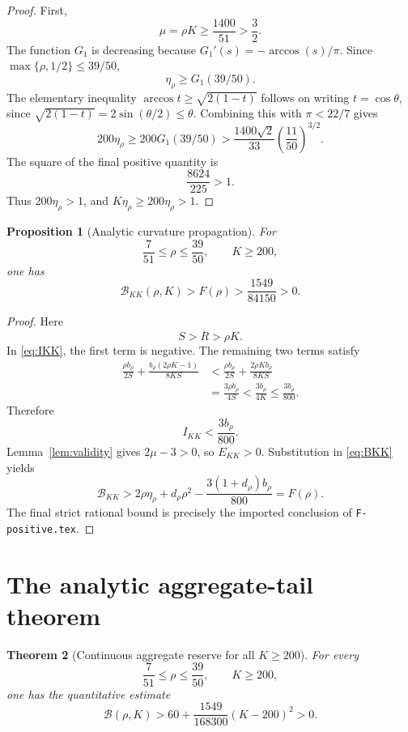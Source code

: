 \documentclass[11pt]{article}
\newtheorem{theorem}{Theorem}
\newtheorem{proposition}[theorem]{Proposition}
\newcommand{\Bcal}{\mathcal B}
\newcommand{\Rbar}{\overline R}
\begin{document}
\begin{proof}
First,
\[
 \mu=\rho K\geq\frac{1400}{51}>\frac32.
\]
The function \(G_1\) is decreasing because
\(G_1'(s)=-\arccos(s)/\pi\).  Since
\(\max\{\rho,1/2\}\leq39/50\),
\[
 \eta_\rho\geq G_1(39/50).
\]
The elementary inequality
\(\arccos t\geq\sqrt{2(1-t)}\) follows on writing
\(t=\cos\theta\), since
\(\sqrt{2(1-t)}=2\sin(\theta/2)\leq\theta\).
Combining this with \(\pi<22/7\) gives
\[
 200\eta_\rho
 \geq200G_1(39/50)
 >\frac{1400\sqrt2}{33}\left(\frac{11}{50}\right)^{3/2}.
\]
The square of the final positive quantity is
\[
 \frac{8624}{225}>1.
\]
Thus \(200\eta_\rho>1\), and \(K\eta_\rho\geq200\eta_\rho>1\).
\end{proof}

\begin{proposition}[Analytic curvature propagation]
\label{prop:curvature}
For
\[
 \frac7{51}\leq\rho\leq\frac{39}{50},
 \qquad K\geq200,
\]
one has
\begin{equation}
 \Bcal_{KK}(\rho,K)>F(\rho)>
 \frac{1549}{84150}>0.
 \label{eq:BKK-positive}
\end{equation}
\end{proposition}

\begin{proof}
Here
\[
 S>\Rbar>\rho K.
\]
In \eqref{eq:IKK}, the first term is negative.  The remaining two terms
satisfy
\begin{align*}
 \frac{\rho b_\rho}{2S}
 +\frac{b_\rho(2\rho K-1)}{8KS}
 &<\frac{\rho b_\rho}{2S}
   +\frac{2\rho Kb_\rho}{8KS}\\
 &=\frac{3\rho b_\rho}{4S}
 <\frac{3b_\rho}{4K}
 \leq\frac{3b_\rho}{800}.
\end{align*}
Therefore
\[
 I_{KK}<\frac{3b_\rho}{800}.
\]
Lemma~\ref{lem:validity} gives \(2\mu-3>0\), so
\(E_{KK}>0\).  Substitution in \eqref{eq:BKK} yields
\[
 \Bcal_{KK}
 >2\rho\eta_\rho+d_\rho\rho^2
  -\frac{3(1+d_\rho)b_\rho}{800}
 =F(\rho).
\]
The final strict rational bound is precisely the imported conclusion of
\texttt{F-positive.tex}.
\end{proof}

\section{The analytic aggregate-tail theorem}

\begin{theorem}[Continuous aggregate reserve for all \(K\geq200\)]
\label{thm:B-tail}
For every
\[
 \frac7{51}\leq\rho\leq\frac{39}{50},
 \qquad K\geq200,
\]
one has the quantitative estimate
\begin{equation}
 \Bcal(\rho,K)>
 60+\frac{1549}{168300}(K-200)^2>0.
 \label{eq:B-tail-lower}
\end{equation}
\end{theorem}
\end{document}
